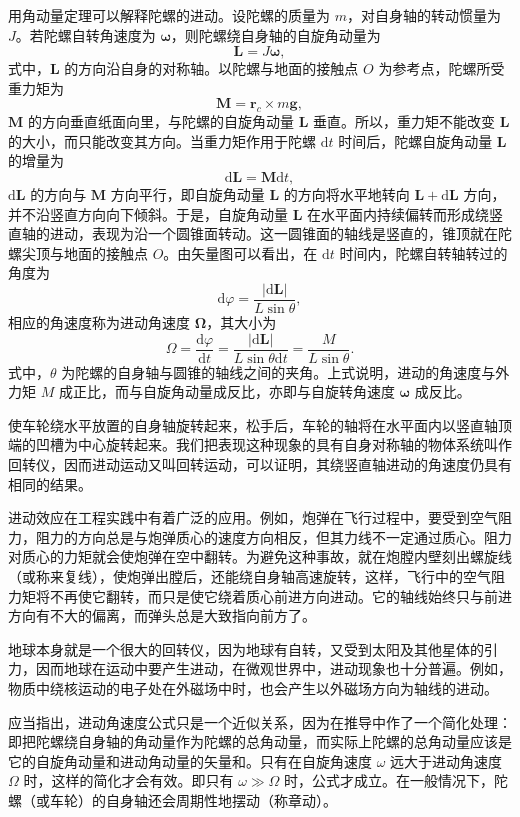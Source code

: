     用角动量定理可以解释陀螺的进动。设陀螺的质量为 $m$，对自身轴的转动惯量为 $J$。若陀螺自转角速度为 $\boldsymbol{\omega}$，则陀螺绕自身轴的自旋角动量为
    \[
    \boldsymbol{L}=J\boldsymbol{\omega},
    \]
    式中，$\boldsymbol{L}$ 的方向沿自身的对称轴。以陀螺与地面的接触点 $O$ 为参考点，陀螺所受重力矩为
    \[
    \boldsymbol{M}=\boldsymbol{r}_c \times m\boldsymbol{g},
    \]
    $\boldsymbol{M}$ 的方向垂直纸面向里，与陀螺的自旋角动量 $\boldsymbol{L}$ 垂直。所以，重力矩不能改变 $\boldsymbol{L}$ 的大小，而只能改变其方向。当重力矩作用于陀螺 $\mathrm{d}t$ 时间后，陀螺自旋角动量 $\boldsymbol{L}$ 的增量为
    \[
    \mathrm{d}\boldsymbol{L}=\boldsymbol{M}\mathrm{d}t,
    \]
    $\mathrm{d}\boldsymbol{L}$ 的方向与 $\boldsymbol{M}$ 方向平行，即自旋角动量 $\boldsymbol{L}$ 的方向将水平地转向 $\boldsymbol{L}+\mathrm{d}\boldsymbol{L}$ 方向，并不沿竖直方向向下倾斜。于是，自旋角动量 $\boldsymbol{L}$ 在水平面内持续偏转而形成绕竖直轴的进动，表现为沿一个圆锥面转动。这一圆锥面的轴线是竖直的，锥顶就在陀螺尖顶与地面的接触点 $O$。由矢量图可以看出，在 $\mathrm{d}t$ 时间内，陀螺自转轴转过的角度为
    \[
    \mathrm{d}\varphi=\frac{|\mathrm{d}\boldsymbol{L}|}{L\sin\theta},
    \]
    相应的角速度称为进动角速度 $\boldsymbol{\Omega}$，其大小为
    \[
    \Omega=\frac{\mathrm{d}\varphi}{\mathrm{d}t}=\frac{|\mathrm{d}\boldsymbol{L}|}{L\sin\theta \mathrm{d}t}=\frac{M}{L\sin\theta}.
    \]
    式中，$\theta$ 为陀螺的自身轴与圆锥的轴线之间的夹角。上式说明，进动的角速度与外力矩 $M$ 成正比，而与自旋角动量成反比，亦即与自旋转角速度 $\boldsymbol{\omega}$ 成反比。

    使车轮绕水平放置的自身轴旋转起来，松手后，车轮的轴将在水平面内以竖直轴顶端的凹槽为中心旋转起来。我们把表现这种现象的具有自身对称轴的物体系统叫作回转仪，因而进动运动又叫回转运动，可以证明，其绕竖直轴进动的角速度仍具有相同的结果。

    进动效应在工程实践中有着广泛的应用。例如，炮弹在飞行过程中，要受到空气阻力，阻力的方向总是与炮弹质心的速度方向相反，但其力线不一定通过质心。阻力对质心的力矩就会使炮弹在空中翻转。为避免这种事故，就在炮膛内壁刻出螺旋线（或称来复线），使炮弹出膛后，还能绕自身轴高速旋转，这样，飞行中的空气阻力矩将不再使它翻转，而只是使它绕着质心前进方向进动。它的轴线始终只与前进方向有不大的偏离，而弹头总是大致指向前方了。

    地球本身就是一个很大的回转仪，因为地球有自转，又受到太阳及其他星体的引力，因而地球在运动中要产生进动，在微观世界中，进动现象也十分普遍。例如，物质中绕核运动的电子处在外磁场中时，也会产生以外磁场方向为轴线的进动。

    应当指出，进动角速度公式只是一个近似关系，因为在推导中作了一个简化处理：即把陀螺绕自身轴的角动量作为陀螺的总角动量，而实际上陀螺的总角动量应该是它的自旋角动量和进动角动量的矢量和。只有在自旋角速度 $\omega$ 远大于进动角速度 $\Omega$ 时，这样的简化才会有效。即只有 $\omega\gg\Omega$ 时，公式才成立。在一般情况下，陀螺（或车轮）的自身轴还会周期性地摆动（称章动）。

